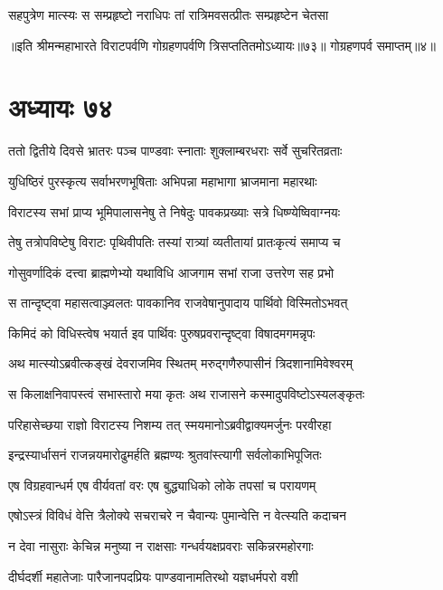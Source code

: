 \twolineshloka
{सहपुत्रेण मात्स्यः स सम्प्रहृष्टो नराधिपः}
{तां रात्रिमवसत्प्रीतः सम्प्रहृष्टेन चेतसा}

॥इति श्रीमन्महाभारते विराटपर्वणि गोग्रहणपर्वणि त्रिसप्ततितमोऽध्यायः॥७३॥ गोग्रहणपर्व समाप्तम्॥४॥

\chapter{अध्यायः ७४}
\twolineshloka
{ततो द्वितीये दिवसे भ्रातरः पञ्च पाण्डवाः}
{स्नाताः शुक्लाम्बरधराः सर्वे सुचरितव्रताः}


\twolineshloka
{युधिष्ठिरं पुरस्कृत्य सर्वाभरणभूषिताः}
{अभिपन्ना महाभागा भ्राजमाना महारथाः}


\twolineshloka
{विराटस्य सभां प्राप्य भूमिपालासनेषु ते}
{निषेदुः पावकप्रख्याः सत्रे धिष्ण्येष्विवाग्नयः}


\twolineshloka
{तेषु तत्रोपविष्टेषु विराटः पृथिवीपतिः}
{तस्यां रात्र्यां व्यतीतायां प्रातःकृत्यं समाप्य च}


\twolineshloka
{गोसुवर्णादिकं दत्त्वा ब्राह्मणेभ्यो यथाविधि}
{आजगाम सभां राजा उत्तरेण सह प्रभो}


\twolineshloka
{स तान्दृष्ट्वा महासत्वाञ्ज्वलतः पावकानिव}
{राजवेषानुपादाय पार्थिवो विस्मितोऽभवत्}



\twolineshloka
{किमिदं को विधिस्त्वेष भयार्त इव पार्थिवः}
{पुरुषप्रवरान्दृष्ट्वा विषादमगमन्नृपः}


\twolineshloka
{अथ मात्स्योऽब्रवीत्कङ्खं देवराजमिव स्थितम्}
{मरुद्गणैरुपासीनं त्रिदशानामिवेश्वरम्}


\twolineshloka
{स किलाक्षनिवापस्त्वं सभास्तारो मया कृतः}
{अथ राजासने कस्मादुपविष्टोऽस्यलङ्कृतः}



\twolineshloka
{परिहासेच्छया राज्ञो विराटस्य निशम्य तत्}
{स्मयमानोऽब्रवीद्वाक्यमर्जुनः परवीरहा}


\twolineshloka
{इन्द्रस्यार्धासनं राजन्नयमारोढुमर्हति}
{ब्रह्मण्यः श्रुतवांस्त्यागी सर्वलोकाभिपूजितः}


\twolineshloka
{एष विग्रहवान्धर्म एष वीर्यवतां वरः}
{एष बुद्ध्याधिको लोके तपसां च परायणम्}


\twolineshloka
{एषोऽस्त्रं विविधं वेत्ति त्रैलोक्ये सचराचरे}
{न चैवान्यः पुमान्वेत्ति न वेत्स्यति कदाचन}


\twolineshloka
{न देवा नासुराः केचिन्न मनुष्या न राक्षसाः}
{गन्धर्वयक्षप्रवराः सकिन्नरमहोरगाः}


\twolineshloka
{दीर्घदर्शी महातेजाः पारैजानपदप्रियः}
{पाण्डवानामतिरथो यज्ञधर्मपरो वशी}


